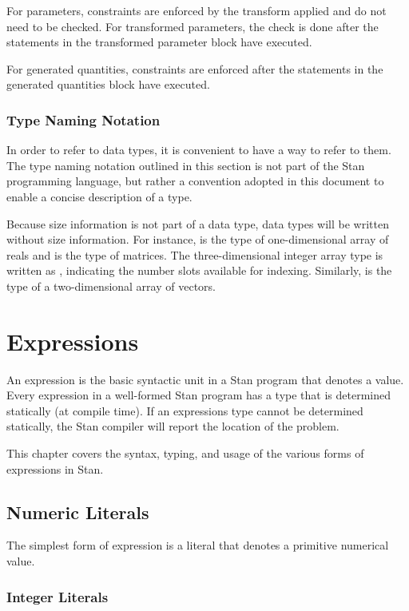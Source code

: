 For parameters, constraints are enforced by the transform applied and
do not need to be checked.  For transformed parameters, the check is
done after the statements in the transformed parameter block have
executed.  

For generated quantities, constraints are enforced after the
statements in the generated quantities block have executed.


\subsection{Type Naming Notation}

In order to refer to data types, it is convenient to have a way to
refer to them.  The type naming notation outlined in this section is
not part of the Stan programming language, but rather a convention
adopted in this document to enable a concise description of a type.

Because size information is not part of a data type, data
types will be written without size information.  For instance,
 is the type of one-dimensional array of reals and
 is the type of matrices.  The three-dimensional integer
array type is written as , indicating the number slots
available for indexing.  Similarly,  is the type of a
two-dimensional array of vectors.


\chapter{Expressions}

\noindent 
An expression is the basic syntactic unit in a Stan program that
denotes a value.  Every expression in a well-formed Stan program has
a type that is determined statically (at compile time).  If an
expressions type cannot be determined statically, the Stan compiler
will report the location of the problem.

This chapter covers the syntax, typing, and usage of the various forms
of expressions in Stan. 

\section{Numeric Literals}

The simplest form of expression is a literal that denotes a primitive
numerical value.   

\subsection{Integer Literals}

